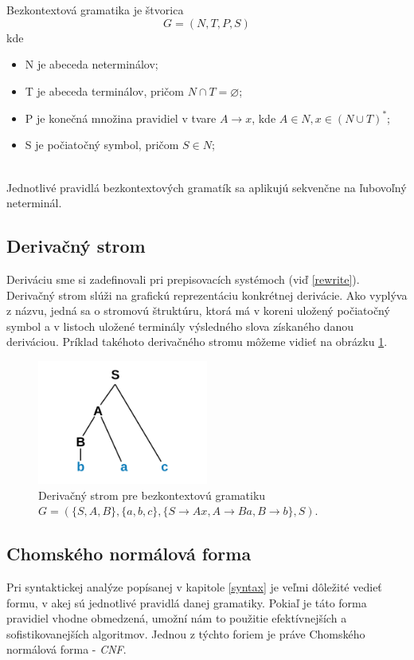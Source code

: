 \begin{definition}
Bezkontextová gramatika je štvorica
\[ G = (N, T, P, S) \]
kde

\begin{itemize}
    \itemsep0.2em 
    \item[] N je abeceda neterminálov;
    \item[] T je abeceda terminálov, pričom $ N \cap T = \varnothing $;
    \item[] P je konečná množina pravidiel v tvare $ A \to x $, kde $ A \in N, x \in (N \cup T)^* $;
    \item[] S je počiatočný symbol, pričom $ S \in N $;
\end{itemize}
\end{definition}
\hfill\\
Jednotlivé pravidlá bezkontextových gramatík sa aplikujú sekvenčne na ľubovoľný neterminál.


\subsection*{Derivačný strom}
Deriváciu sme si zadefinovali pri prepisovacích systémoch (viď \ref{rewrite}). Derivačný strom slúži na grafickú reprezentáciu konkrétnej derivácie. Ako vyplýva z názvu, jedná sa o stromovú štruktúru, ktorá má v koreni uložený počiatočný symbol a v listoch uložené terminály výsledného slova získaného danou deriváciou.
Príklad takéhoto derivačného stromu môžeme vidieť na obrázku \ref{derivationTree}.

\begin{figure}[hbt]
	\centering
	\includegraphics[width=0.5\textwidth]{obrazky-figures/derivationTree.png}
	\caption{Derivačný strom pre bezkontextovú gramatiku $G = (\{S, A, B\}, \{a, b, c\}, \{S\to Ax, A\to Ba, B\to b\}, S)$.}
	\label{derivationTree}
\end{figure}


\subsection{Chomského normálová forma}
\label{CNF}
Pri syntaktickej analýze popísanej v kapitole \ref{syntax} je veľmi dôležité vedieť formu, v akej sú jednotlivé pravidlá danej gramatiky. Pokiaľ je táto forma pravidiel vhodne obmedzená, umožní nám to použitie efektívnejších a sofistikovanejších algoritmov. Jednou z týchto foriem je práve Chomského normálová forma - \textit{CNF}.

